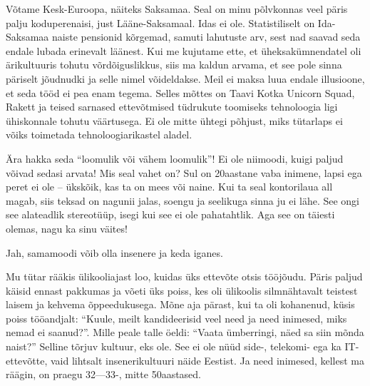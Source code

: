 
Võtame Kesk-Euroopa, näiteks Saksamaa. Seal on
minu põlvkonnas veel päris palju koduperenaisi, just Lääne-Saksamaal. 
Idas ei ole. Statistiliselt on Ida-Saksamaa naiste 
pensionid kõrgemad, samuti lahutuste arv, sest nad saavad 
seda endale lubada erinevalt läänest. Kui me kujutame ette, et 
üheksakümnendatel oli ärikultuuris tohutu võrdõiguslikkus, siis ma kaldun arvama, 
et see pole sinna päriselt jõudnudki ja selle nimel võideldakse. Meil ei maksa luua endale illusioone, 
et seda tööd ei pea enam tegema. Selles mõttes on Taavi Kotka Unicorn Squad, Rakett ja teised sarnased ettevõtmised tüdrukute 
toomiseks tehnoloogia ligi ühiskonnale tohutu väärtusega. Ei 
ole mitte ühtegi põhjust, miks tütarlaps ei võiks toimetada tehnoloogiarikastel 
aladel.


Ära hakka seda \enquote{loomulik või vähem loomulik}! Ei ole niimoodi, kuigi paljud võivad sedasi arvata! Mis seal vahet on? Sul 
on 20aastane vaba inimene, lapsi ega peret ei ole -- ükskõik, kas ta on mees või naine. Kui 
ta seal kontorilaua all magab, siis teksad on nagunii jalas, soengu ja 
seelikuga sinna ju ei lähe. See ongi see alateadlik stereotüüp, isegi kui see ei ole pahatahtlik. Aga see on täiesti olemas, nagu ka sinu 
väites!


Jah, samamoodi võib olla insenere ja keda iganes.


Mu tütar rääkis ülikooliajast loo, kuidas üks ettevõte otsis tööjõudu. 
Päris paljud käisid ennast pakkumas ja võeti üks poiss, kes oli ülikoolis 
silmnähtavalt teistest laisem ja kehvema õppeedukusega. Mõne aja pärast, kui ta oli kohanenud, küsis poiss
tööandjalt: \enquote{Kuule, meilt kandideerisid veel need ja 
need inimesed, miks nemad ei saanud?}. Mille peale talle öeldi: 
\enquote{Vaata ümberringi, näed sa siin mõnda naist?} Selline tõrjuv kultuur, 
eks ole. See ei ole nüüd side-, telekomi- ega ka IT-ettevõtte, vaid lihtsalt insenerikultuuri näide Eestist. Ja need inimesed, 
kellest ma räägin, on praegu 32---33-, mitte 50aastased.

